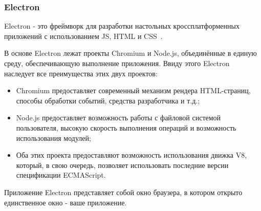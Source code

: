 \subsubsection{Electron}

Electron - это фреймворк для разработки настольных кроссплатформенных приложений с использованием JS, HTML и CSS~\cite{electron}.

В основе Electron лежат проекты Chromium и Node.js, объединённые в единую среду, обеспечивающую выполнение приложения. Ввиду этого Electron наследует все преимущества этих двух проектов:

\begin{itemize}
  \item Chromium предоставляет современный механизм рендера HTML-страниц, способы обработки событий, средства разработчика и т.д.;
  \item Node.js предоставляет возможность работы с файловой системой пользователя, высокую скорость выполнения операций и возможность использования модулей;
  \item Оба этих проекта предоставляют возможность использования движка V8, который, в свою очередь, позволяет использовать последние версии спецификации ECMAScript.
\end{itemize}

Приложение Electron представляет собой окно браузера, в котором открыто единственное окно - ваше приложение.